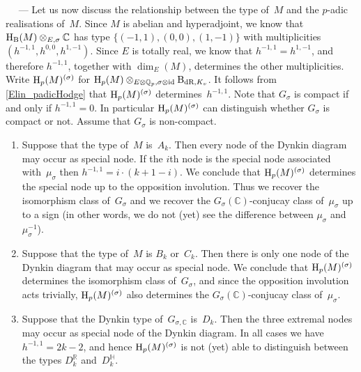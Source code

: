 \documentclass[10pt,twoside,leqno]{article}
\renewcommand{\paragraph}[1]{\par\bigskip\refstepcounter{subsection}%
 {\normalfont\normalsize\scshape\noindent\thesubsection%
 \ifthenelse{\equal{#1}{}}%
 {}%
 {\ \textls{#1.}}%
 \ ---}%
}
\numberwithin{equation}{subsection}
\newcommand{\id}{\textnormal{id}}
\newcommand{\QQ}{\mathbb{Q}}
\newcommand{\QQp}{\QQ_{p}}
\newcommand{\RR}{\mathbb{R}}
\newcommand{\CC}{\mathbb{C}}
\newcommand{\HQ}{\mathbb{H}}
\newcommand{\BdR}[1]{\textnormal{B}_{\dR,#1}}
\newcommand{\dR}{\textnormal{dR}}
\newcommand{\HH}{\textnormal{H}}
\newcommand{\Hp}{\HH_{p}}
\newcommand{\HB}{\HH_{\textnormal{B}}}
\begin{document}
\paragraph{} %
Let us now discuss the relationship between the type of~\(M\)
and the \(p\)-adic realisations of~\(M\).
Since \(M\) is abelian and hyperadjoint,
we know that \(\HB(M) \otimes_{E,\sigma} \CC\)
has type \(\{(-1,1), (0,0), (1,-1)\}\) with multiplicities
\((h^{-1,1},h^{0,0},h^{1,-1})\).
Since \(E\) is totally real, we know that \(h^{-1,1} = h^{1,-1}\),
and therefore \(h^{-1,1}\), together with \(\dim_{E}(M)\),
determines the other multiplicities.
Write \(\Hp(M)^{(\sigma)}\) for
\(\Hp(M) \otimes_{E \otimes \QQp, \sigma \otimes \id} \BdR{K_{v}}\).
It follows from \cref{Elin_padicHodge}
that \(\Hp(M)^{(\sigma)}\) determines~\(h^{-1,1}\).
Note that \(G_{\sigma}\) is compact if and only if \(h^{-1,1} = 0\).
In particular \(\Hp(M)^{(\sigma)}\) can distinguish whether
\(G_{\sigma}\) is compact or not.
Assume that \(G_{\sigma}\) is non-compact.
\begin{enumerate}
 \item Suppose that the type of~\(M\) is~\(A_{k}\).
  Then every node of the Dynkin diagram may occur as special node.
  If the \(i\)th node is the special node associated with~\(\mu_{\sigma}\)
  then \(h^{-1,1} = i\cdot(k+1-i)\).
  We conclude that \(\Hp(M)^{(\sigma)}\)
  determines the special node up to the opposition involution.
  Thus we recover the isomorphism class of~\(G_{\sigma}\)
  and we recover the \(G_{\sigma}(\CC)\)-conjucay class of~\(\mu_{\sigma}\)
  up to a sign (in other words, we do not (yet)
  see the difference between \(\mu_{\sigma}\) and~\(\mu_{\sigma}^{-1}\)).
 \item Suppose that the type of~\(M\) is \(B_{k}\) or~\(C_{k}\).
  Then there is only one node of the Dynkin diagram
  that may occur as special node.
  We conclude that \(\Hp(M)^{(\sigma)}\) determines
  the isomorphism class of~\(G_{\sigma}\),
  and since the opposition involution acts trivially,
  \(\Hp(M)^{(\sigma)}\) also determines
  the \(G_{\sigma}(\CC)\)-conjucay class of~\(\mu_{\sigma}\).
 \item Suppose that the Dynkin type of~\(G_{\sigma,\CC}\) is~\(D_{k}\).
  Then the three extremal nodes may occur as special node of the Dynkin diagram.
  In all cases we have \(h^{-1,1} = 2k-2\),
  and hence \(\Hp(M)^{(\sigma)}\) is not (yet) able to distinguish
  between the types \(D_{k}^{\RR}\) and~\(D_{k}^{\HQ}\).
\end{enumerate}
\end{document}
